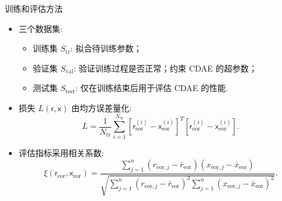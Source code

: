 \documentclass{beamer}
\newcommand{\R}[1]{\text{#1}}  %
\newcommand{\B}[1]{\bm{\mathsf{#1}}}  %
\begin{document}
\begin{frame}{训练和评估方法}
  \begin{itemize}
    \item 三个数据集:
      \begin{itemize}
        \item \alert{训练集 $S_{\R{tr}}$}: 拟合待训练参数；
        \item \alert{验证集 $S_{\R{val}}$}:
          验证训练过程是否正常；约束 CDAE 的超参数；
        \item \alert{测试集 $S_{\R{test}}$}:
          仅在训练结束后用于评估 CDAE 的性能.
      \end{itemize}
    \item 损失 $L(\B{r}, \B{x})$ 由\alert{均方误差}量化:
      \begin{equation}
        L = \frac{1}{N_{\R{tr}}} \sum_{i=1}^{N_{\R{tr}}}
            \left[ \B{r}_{\R{eor}}^{(i)} - \B{x}_{\R{eor}}^{(i)} \right]^T
            \left[ \B{r}_{\R{eor}}^{(i)} - \B{x}_{\R{eor}}^{(i)} \right] .
      \end{equation}
    \item 评估指标采用\alert{相关系数}:
      \begin{equation}
        \xi(\B{r}_{\R{eor}}, \B{x}_{\R{eor}})
          = \frac{\sum_{j=1}^{n}(r_{\R{eor},j} - \bar{r}_{\R{eor}})
              (x_{\R{eor},j} - \bar{x}_{\R{eor}})}{
                \sqrt{\sum_{j=1}^{n}(r_{\R{eor},j} - \bar{r}_{\R{eor}})^2
                \sum_{j=1}^{n}(x_{\R{eor},j} - \bar{x}_{\R{eor}})^2}
            } .
      \end{equation}
  \end{itemize}
\end{frame}
\end{document}
